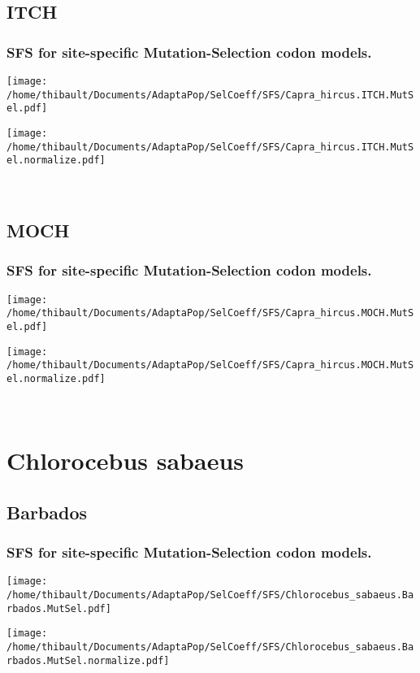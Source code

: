 \subsection{ITCH} 
 
\subsubsection*{SFS for site-specific Mutation-Selection codon models.} 
\begin{minipage}{0.49\linewidth} 
\texttt{[image: /home/thibault/Documents/AdaptaPop/SelCoeff/SFS/Capra\_hircus.ITCH.MutSel.pdf]} 
\end{minipage}
\begin{minipage}{0.49\linewidth}
\texttt{[image: /home/thibault/Documents/AdaptaPop/SelCoeff/SFS/Capra\_hircus.ITCH.MutSel.normalize.pdf]} 
\end{minipage}
\\ 
\subsection{MOCH} 
 
\subsubsection*{SFS for site-specific Mutation-Selection codon models.} 
\begin{minipage}{0.49\linewidth} 
\texttt{[image: /home/thibault/Documents/AdaptaPop/SelCoeff/SFS/Capra\_hircus.MOCH.MutSel.pdf]} 
\end{minipage}
\begin{minipage}{0.49\linewidth}
\texttt{[image: /home/thibault/Documents/AdaptaPop/SelCoeff/SFS/Capra\_hircus.MOCH.MutSel.normalize.pdf]} 
\end{minipage}
\\ 
\section{Chlorocebus sabaeus} 
 
\subsection{Barbados} 
 
\subsubsection*{SFS for site-specific Mutation-Selection codon models.} 
\begin{minipage}{0.49\linewidth} 
\texttt{[image: /home/thibault/Documents/AdaptaPop/SelCoeff/SFS/Chlorocebus\_sabaeus.Barbados.MutSel.pdf]} 
\end{minipage}
\begin{minipage}{0.49\linewidth}
\texttt{[image: /home/thibault/Documents/AdaptaPop/SelCoeff/SFS/Chlorocebus\_sabaeus.Barbados.MutSel.normalize.pdf]} 
\end{minipage}
\\ 
